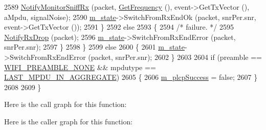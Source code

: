 \begin{DoxyCode}
2589           \hyperlink{classns3_1_1WifiPhy_a582de54d4e2e0a49581635d1c8f60512}{NotifyMonitorSniffRx} (packet, \hyperlink{classns3_1_1WifiPhy_ad2508d94faf22d690d6b8b4367934fd1}{GetFrequency} (), event->GetTxVector
       (), aMpdu, signalNoise);
2590           \hyperlink{classns3_1_1WifiPhy_a020dae8902d858e3d121aa7a67ca2528}{m\_state}->SwitchFromRxEndOk (packet, snrPer.snr, event->GetTxVector ());
2591         \}
2592       \textcolor{keywordflow}{else}
2593         \{
2594           \textcolor{comment}{/* failure. */}
2595           \hyperlink{classns3_1_1WifiPhy_a72138f22fada63f61f2026b86aa5abd2}{NotifyRxDrop} (packet);
2596           \hyperlink{classns3_1_1WifiPhy_a020dae8902d858e3d121aa7a67ca2528}{m\_state}->SwitchFromRxEndError (packet, snrPer.snr);
2597         \}
2598     \}
2599   \textcolor{keywordflow}{else}
2600     \{
2601       \hyperlink{classns3_1_1WifiPhy_a020dae8902d858e3d121aa7a67ca2528}{m\_state}->SwitchFromRxEndError (packet, snrPer.snr);
2602     \}
2603 
2604   \textcolor{keywordflow}{if} (preamble == \hyperlink{group__wifi_gga5e94a56cb338a14ffbbb19c6a41251eba97c5c71995de5f28931200e6d5a38a66}{WIFI\_PREAMBLE\_NONE} && mpdutype == 
      \hyperlink{namespacens3_ae617d41bbd0c07fa58ee2306f687b055a00f5645550d1d4766ba10c4ac229b276}{LAST\_MPDU\_IN\_AGGREGATE})
2605     \{
2606       \hyperlink{classns3_1_1WifiPhy_ad9a571bc52ef6cd8e63cff3dc14a718e}{m\_plcpSuccess} = \textcolor{keyword}{false};
2607     \}
2608 
2609 \}
\end{DoxyCode}


Here is the call graph for this function\+:




Here is the caller graph for this function\+:


